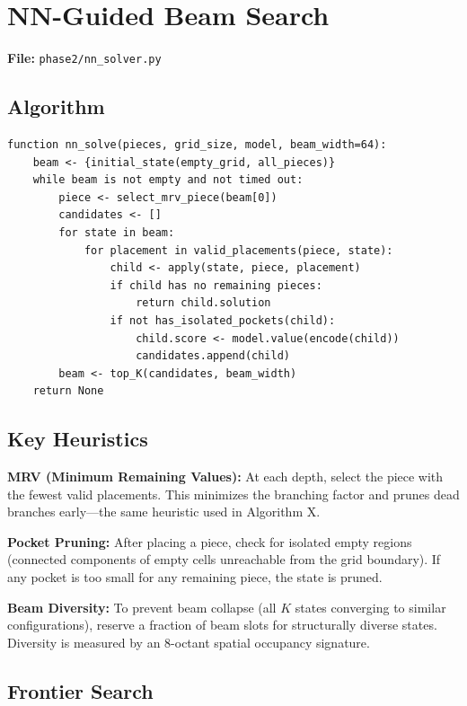 \documentclass[11pt]{article}
\begin{document}
\section{NN-Guided Beam Search}

\textbf{File:} \texttt{phase2/nn\_solver.py}

\subsection{Algorithm}

\begin{lstlisting}
function nn_solve(pieces, grid_size, model, beam_width=64):
    beam <- {initial_state(empty_grid, all_pieces)}
    while beam is not empty and not timed out:
        piece <- select_mrv_piece(beam[0])
        candidates <- []
        for state in beam:
            for placement in valid_placements(piece, state):
                child <- apply(state, piece, placement)
                if child has no remaining pieces:
                    return child.solution
                if not has_isolated_pockets(child):
                    child.score <- model.value(encode(child))
                    candidates.append(child)
        beam <- top_K(candidates, beam_width)
    return None
\end{lstlisting}

\subsection{Key Heuristics}

\textbf{MRV (Minimum Remaining Values):} At each depth, select the piece with the fewest valid placements. This minimizes the branching factor and prunes dead branches early---the same heuristic used in Algorithm X.

\textbf{Pocket Pruning:} After placing a piece, check for isolated empty regions (connected components of empty cells unreachable from the grid boundary). If any pocket is too small for any remaining piece, the state is pruned.

\textbf{Beam Diversity:} To prevent beam collapse (all $K$ states converging to similar configurations), reserve a fraction of beam slots for structurally diverse states. Diversity is measured by an 8-octant spatial occupancy signature.

\subsection{Frontier Search}
\end{document}
